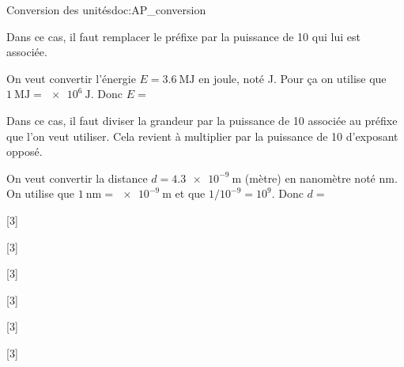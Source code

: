 \begin{doc}{Conversion des unités}{doc:AP_conversion}

  Dans ce cas, il faut remplacer le préfixe par la puissance de 10 qui lui est associée.
  
  \exemple On veut convertir l'énergie $E = \qty{3,6}{\mega\joule}$ en joule, noté \unit{\joule}.
  Pour ça on utilise que $\qty{1}{\mega\joule} = \qty{e6}{\joule}$.
  Donc $E =$ 

  \bigskip

  Dans ce cas, il faut diviser la grandeur par la puissance de 10 associée au préfixe que l'on veut utiliser.
  Cela revient à multiplier par la puissance de 10 d'exposant opposé.

  \exemple On veut convertir la distance $d = \qty{4,3e-9}{\m}$ (mètre) en nanomètre noté \unit{nm}.
  On utilise que $\qty{1}{\nano\m} = \qty{e-9}{\m}$ et que $1 / 10^{-9} = 10^9$. 
  Donc $d = $ 
\end{doc}

[3]

[3]

[3]

[3]

[3]

[3]